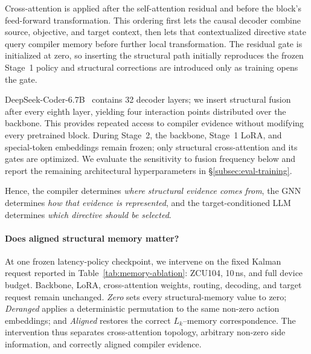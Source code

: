 Cross-attention is applied after the self-attention residual and before the block's feed-forward transformation. 
This ordering first lets the causal decoder combine source, objective, and target context, then lets that contextualized directive state query compiler memory before further local transformation. 
The residual gate is initialized at zero, so inserting the structural path initially reproduces the frozen Stage~1 policy and structural corrections are introduced only as training opens the gate. 

DeepSeek-Coder-6.7B~\cite{guo2024deepseekcoder} contains 32 decoder layers; we insert structural fusion after every eighth layer, yielding four interaction points distributed over the backbone. 
This provides repeated access to compiler evidence without modifying every pretrained block. During Stage~2, the backbone, Stage~1 LoRA, and special-token embeddings remain frozen; only structural cross-attention and its gates are optimized. 
We evaluate the sensitivity to fusion frequency below and report the remaining architectural hyperparameters in \S\ref{subsec:eval-training}.

Hence, the compiler determines \emph{where structural evidence comes from}, the GNN determines \emph{how that evidence is represented}, and the target-conditioned LLM determines \emph{which directive should be selected}.


\paragraph{Does aligned structural memory matter?}
At one frozen latency-policy checkpoint, we intervene on the fixed Kalman request reported in Table~\ref{tab:memory-ablation}: ZCU104, 10\,ns, and full device budget. 
Backbone, LoRA, cross-attention weights, routing, decoding, and target request remain unchanged. \emph{Zero} sets every structural-memory value to zero; \emph{Deranged} applies a deterministic permutation to the same non-zero action embeddings; and \emph{Aligned} restores the correct $L_k$--memory correspondence. The intervention thus separates cross-attention topology, arbitrary non-zero side information, and correctly aligned compiler evidence.

